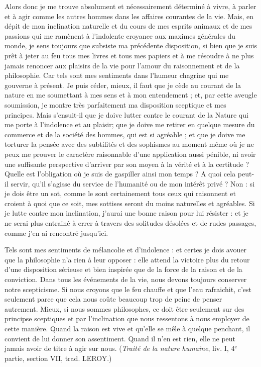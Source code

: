 Alors donc je me trouve absolument et nécessairement
déterminé à vivre, à parler et à agir comme les autres
hommes dans les affaires courantes de la vie. Mais, en
dépit de mon inclination naturelle et du cours de mes
esprits animaux et de mes passions qui me ramènent à
l'indolente croyance aux maximes générales du monde,
je sens toujours que subsiste ma précédente disposition,
si bien que je suis prêt à jeter au feu tous mes livres et
tous mes papiers et à me résoudre à ne plus jamais renoncer
aux plaisirs de la vie pour l’amour du raisonnement et de
la philosophie. Car tels sont mes sentiments dans l’humeur
chagrine qui me gouverne à présent. Je puis céder, mieux,
il faut que je cède au courant de la nature en me soumettant
à mes sens et à mon entendement ; et, par cette
aveugle soumission, je montre très parfaitement ma
disposition sceptique et mes principes. Mais s’ensuit-il
que je doive lutter contre le courant de la Nature qui me
porte à l'indolence et au plaisir; que je doive me retirer
en quelque mesure du commerce et de la société des
hommes, qui est si agréable ; et que je doive me torturer
la pensée avec des subtilités et des sophismes au moment
même où je ne peux me prouver le caractère raisonnable
d'une application aussi pénible, ni avoir une suffisante
perspective d’arriver par son moyen à la vérité et à la
certitude ? Quelle est l'obligation où je suis de gaspiller
ainsi mon temps ? A quoi cela peut-il servir, qu'il s’agisse
du service de l’humanité ou de mon intérêt privé ? Non :
si je dois être un sot, comme le sont certainement tous ceux
qui raisonnent et croient à quoi que ce soit, mes sottises
seront du moins naturelles et agréables. Si je lutte contre
mon inclination, j’aurai une bonne raison pour lui résister :
et je ne serai plus entrainé à errer à travers des solitudes
désolées et de rudes passages, comme j’en ai rencontré
jusqu’ici.

Tels sont mes sentiments de mélancolie et d’indolence :
et certes je dois avouer que la philosophie n’a rien à leur
opposer : elle attend la victoire plus du retour d’une disposition
sérieuse et bien inspirée que de la force de la
raison et de la conviction. Dans tous les événements de la
vie, nous devons toujours conserver notre scepticisme.
Si nous croyons que le feu chauffe et que l’eau rafraichit,
c’est seulement parce que cela nous coûte beaucoup trop
de peine de penser autrement. Mieux, si nous sommes
philosophes, ce doit être seulement sur des principse
sceptiques et par l’inclination que nous ressentons à nous
employer de cette manière. Quand la raison est vive et
qu’elle se mêle à quelque penchant, il convient de lui
donner son assentiment. Quand il n’en est rien, elle
ne peut jamais avoir de titre à agir sur nous. ({\it Traité
de la nature humaine}, liv. I, 4$^\text{e}$ partie, section VII,
trad. L{\footnotesize EROY}.)

